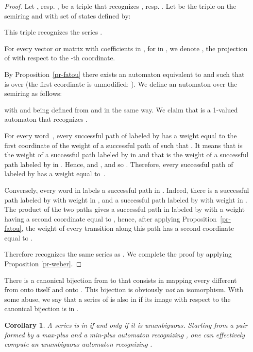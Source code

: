 \documentclass{article}
\newtheorem{crllr}[thrm]{Corollary}
\newcommand{\1}{\mathbb{1}}
\newcommand{\0}{\mathbb{0}}
\begin{document}
\begin{proof}
Let , resp. , be a triple
that recognizes , resp. .
Let   be the triple on the semiring  and with set of states  defined by:

This triple recognizes the series .

For every vector or matrix  with coefficients in ,
for  in , we denote , the projection of  with
respect to the -th coordinate.

By Proposition~\ref{pr-fatou} there exists an
automaton  
equivalent to  and such that
 is over  (the first
ccordinate is unmodified: ).
We define an automaton
 over the semiring
 as follows:

with  and  being defined from
 and  in the same way. 
We claim that  is a
1-valued automaton that recognizes . 

For every word~, every successful path of
 labeled by  has a weight equal to the first coordinate 
of the weight  of a successful path of  such that .
It means that  is the weight of a successful path labeled by  in 
and that  is the weight of a successful path labeled by  in .
Hence,  and ,
and so .
Therefore, every successful path of 
labeled by  has a weight equal to~.

Conversely, every word  in  labels a successful path in .
Indeed, there is a successful path labeled by  with weight  in ,
and a successful path labeled by  with weight  in .
The product of the two paths gives a successful path in
 labeled by  with a weight
having a second coordinate equal to , hence, after applying
Proposition~\ref{pr-fatou}, the weight of every transition along this path has
a second coordinate equal to . 

Therefore  recognizes the same series as . We complete the
proof by applying Proposition \ref{pr-weber}. 
\end{proof}

There is a canonical bijection from  to  that consists
in mapping every  different from  onto itself and 
onto . This bijection is obviously {\it not} an isomorphism.
With some abuse, we say that a series  of  is also
in  if its image with respect to the canonical bijection
is in .

\begin{crllr}
\label{pr-maxmin3}
A series  is in  if and
only if it is unambiguous. Starting from a pair formed by a max-plus
and a min-plus automaton recognizing , one can effectively compute an
unambiguous automaton recognizing . 
\end{crllr}
\end{document}
